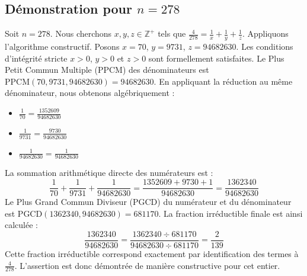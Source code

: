 \documentclass[11pt,a4paper]{article}
\begin{document}
\subsection{Démonstration pour $n = 278$}
Soit $n = 278$. Nous cherchons $x, y, z \in \mathbb{Z}^{+}$ tels que $\frac{4}{278} = \frac{1}{x} + \frac{1}{y} + \frac{1}{z}$.
Appliquons l'algorithme constructif. Posons $x = 70$, $y = 9731$, $z = 94682630$.
Les conditions d'intégrité stricte $x > 0$, $y > 0$ et $z > 0$ sont formellement satisfaites.
Le Plus Petit Commun Multiple (PPCM) des dénominateurs est $\text{PPCM}(70, 9731, 94682630) = 94682630$.
En appliquant la réduction au même dénominateur, nous obtenons algébriquement :
\begin{itemize}
    \item $\frac{1}{70} = \frac{1352609}{94682630}$
    \item $\frac{1}{9731} = \frac{9730}{94682630}$
    \item $\frac{1}{94682630} = \frac{1}{94682630}$
\end{itemize}
La sommation arithmétique directe des numérateurs est :
$$ \frac{1}{70} + \frac{1}{9731} + \frac{1}{94682630} = \frac{1352609 + 9730 + 1}{94682630} = \frac{1362340}{94682630} $$
Le Plus Grand Commun Diviseur (PGCD) du numérateur et du dénominateur est $\text{PGCD}(1362340, 94682630) = 681170$.
La fraction irréductible finale est ainsi calculée :
$$ \frac{1362340}{94682630} = \frac{1362340 \div 681170}{94682630 \div 681170} = \frac{2}{139} $$
Cette fraction irréductible correspond exactement par identification des termes à $\frac{4}{278}$. L'assertion est donc démontrée de manière constructive pour cet entier.
\end{document}
